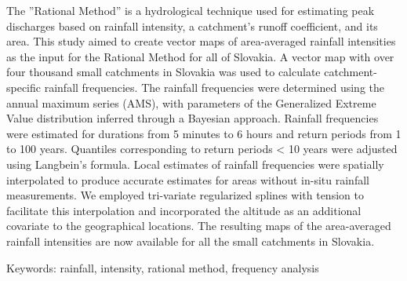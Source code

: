 {}
\begin{flushleft}





\end{flushleft}

\noindent

The ”Rational Method” is a hydrological technique used for estimating peak discharges based on rainfall intensity, a catchment's runoff coefficient, and its area. This study aimed to create vector maps of area-averaged rainfall intensities as the input for the Rational Method for all of Slovakia. A vector map with over four thousand small catchments in Slovakia was used to calculate catchment-specific rainfall frequencies. The rainfall frequencies were determined using the annual maximum series (AMS), with parameters of the Generalized Extreme Value distribution inferred through a Bayesian approach. Rainfall frequencies were estimated for durations from 5 minutes to 6 hours and return periods from 1 to 100 years. Quantiles corresponding to return periods < 10 years were adjusted using Langbein’s formula. Local estimates of rainfall frequencies were spatially interpolated to produce accurate estimates for areas without in-situ rainfall measurements. We employed tri-variate regularized splines with tension to facilitate this interpolation and incorporated the altitude as an additional covariate to the geographical locations. The resulting maps of the area-averaged rainfall intensities are now available for all the small catchments in Slovakia.

Keywords: rainfall, intensity, rational method, frequency analysis
\newpage{}
{}
\begin{flushleft}





\end{flushleft}

